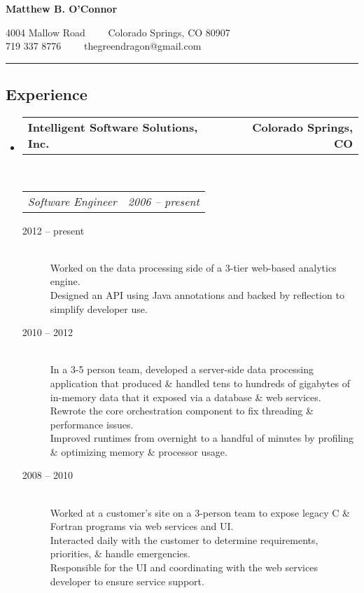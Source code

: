 \documentclass[10pt,letterpaper]{article}
\makeatletter
\newcommand{\headerrow}[2]
{\begin{tabular*}{\linewidth}{l@{\extracolsep{\fill}}r}
	#1 &
	#2 \\
\end{tabular*}}
\makeatother
\begin{document}
\begin{center}
{\LARGE \textbf{Matthew B. O'Connor}}

4004 Mallow Road\ \ \textbullet
\ \ Colorado Springs, CO 80907
\\
719 337 8776\ \ \textbullet
\ \ thegreendragon@gmail.com
\end{center}

\hrule
\vspace{-0.4em}
\subsection*{Experience}

\begin{itemize}
	\parskip=0.1em

	\item
	\headerrow
		{\textbf{Intelligent Software Solutions, Inc.}}
		{\textbf{Colorado Springs, CO}}
	\\
	\headerrow
		{\emph{Software Engineer}}
		{\emph{2006 -- present}}
	\begin{description}
		\item[2012 -- present] \hfill \\ %
				Worked on the data processing side of a 3-tier web-based analytics engine. \\
				Designed an API using Java annotations and backed by reflection to simplify developer use.
		\item[2010 -- 2012] \hfill \\ %
				In a 3-5 person team, developed a server-side data processing application that produced \& handled tens to hundreds of gigabytes of in-memory data that it exposed via a database \& web services. \\
				Rewrote the core orchestration component to fix threading \& performance issues. \\
				Improved runtimes from overnight to a handful of minutes by profiling \& optimizing memory \& processor usage.
		\item[2008 -- 2010] \hfill \\ %
				Worked at a customer's site on a 3-person team to expose legacy C \& Fortran programs via web services and UI. \\
				Interacted daily with the customer to determine requirements, priorities, \& handle emergencies. \\
				Responsible for the UI and coordinating with the web services developer to ensure service support. \\

\end{description}
\end{itemize}
\end{document}
